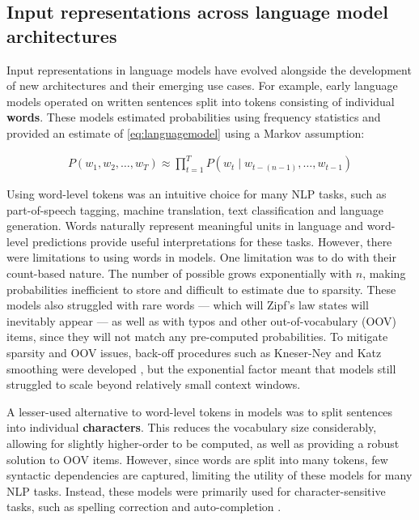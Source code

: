 \subsection{Input representations across language model architectures}\label{sec:12-architectures}

Input representations in language models have evolved alongside the development of new architectures and their emerging use cases. For example, early \ngram language models operated on written sentences split into tokens consisting of individual \textbf{words}. These models estimated probabilities using frequency statistics and provided an estimate of \cref{eq:languagemodel} using a Markov assumption:

\begin{align}
    P(w_1, w_2, \dots, w_T) \approx \prod_{t=1}^{T} P\left(w_t \mid w_{t-(n-1)}, \dots, w_{t-1}\right) \label{eq:ngram}
\end{align}

Using word-level tokens was an intuitive choice for many NLP tasks, such as part-of-speech tagging, machine translation, text classification and language generation. Words naturally represent meaningful units in language and word-level predictions provide useful interpretations for these tasks. However, there were limitations to using words in \ngram models. One limitation was to do with their count-based nature. The number of possible \ngrams grows exponentially with $n$, making probabilities inefficient to store and difficult to estimate due to sparsity. These models also struggled with rare words --- which will Zipf's law states will inevitably appear \citep{zipf_human_1949} --- as well as with typos and other out-of-vocabulary (OOV) items, since they will not match any pre-computed \ngram probabilities. To mitigate sparsity and OOV issues, back-off procedures such as Kneser-Ney and Katz smoothing were developed \citep{ney1994structuring, katz2003estimation}, but the exponential factor meant that \ngram models still struggled to scale beyond relatively small context windows.

A lesser-used alternative to word-level tokens in \ngram models was to split sentences into individual \textbf{characters}. This reduces the vocabulary size considerably, allowing for slightly higher-order \ngrams to be computed, as well as providing a robust solution to OOV items. However, since words are split into many tokens, few syntactic dependencies are captured, limiting the utility of these models for many NLP tasks. Instead, these models were primarily used for character-sensitive tasks, such as spelling correction and auto-completion \citep{cucerzan_spelling_2004}.

